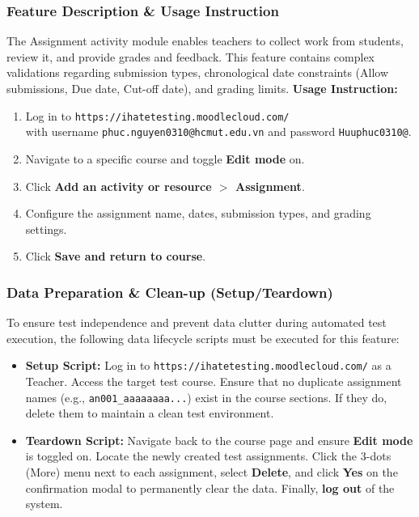 \documentclass[twoside,final]{hcmut-report}
\begin{document}
\subsubsection{Feature Description \& Usage Instruction}
The Assignment activity module enables teachers to collect work from students, review it, and provide grades and feedback. This feature contains complex validations regarding submission types, chronological date constraints (Allow submissions, Due date, Cut-off date), and grading limits.
\newline
\textbf{Usage Instruction:}
\begin{enumerate}
    \item Log in to \texttt{https://ihatetesting.moodlecloud.com/}\\ with username \texttt{phuc.nguyen0310@hcmut.edu.vn} and password \texttt{Huuphuc0310@}.
    \item Navigate to a specific course and toggle \textbf{Edit mode} on.
    \item Click \textbf{Add an activity or resource $>$ Assignment}.
    \item Configure the assignment name, dates, submission types, and grading settings.
    \item Click \textbf{Save and return to course}.
\end{enumerate}

\subsubsection{Data Preparation \& Clean-up (Setup/Teardown)}
To ensure test independence and prevent data clutter during automated test execution, the following data lifecycle scripts must be executed for this feature:
\begin{itemize}
    \item \textbf{Setup Script:} Log in to \texttt{https://ihatetesting.moodlecloud.com/} as a Teacher. Access the target test course. Ensure that no duplicate assignment names (e.g., \texttt{an001\_aaaaaaaa...}) exist in the course sections. If they do, delete them to maintain a clean test environment.
    \item \textbf{Teardown Script:} Navigate back to the course page and ensure \textbf{Edit mode} is toggled on. Locate the newly created test assignments. Click the 3-dots (More) menu next to each assignment, select \textbf{Delete}, and click \textbf{Yes} on the confirmation modal to permanently clear the data. Finally, \textbf{log out} of the system.
\end{itemize}
\end{document}
